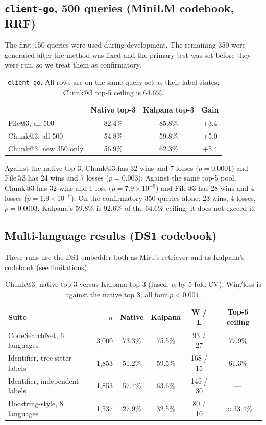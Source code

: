 \documentclass[11pt, a4paper]{article}
\begin{document}
\subsection{\texttt{client-go}, 500 queries (MiniLM codebook, RRF)}
The first 150 queries were used during development. The remaining 350 were generated after the method was fixed and the primary test was set before they were run, so we treat them as confirmatory.

\begin{table}[h]
\centering
\begin{tabular}{@{}lccc@{}}
\toprule
 & \textbf{Native top-3} & \textbf{Kalpana top-3} & \textbf{Gain} \\ \midrule
File@3, all 500 & 82.4\% & 85.8\% & +3.4 \\
Chunk@3, all 500 & 54.8\% & 59.8\% & +5.0 \\
Chunk@3, new 350 only & 56.9\% & 62.3\% & +5.4 \\ \bottomrule
\end{tabular}
\caption{\texttt{client-go}. All rows are on the same query set as their label states; Chunk@3 top-5 ceiling is 64.6\%.}
\end{table}

Against the native top 3, Chunk@3 has 32 wins and 7 losses ($p=0.0001$) and File@3 has 24 wins and 7 losses ($p=0.003$). Against the same top-5 pool, Chunk@3 has 32 wins and 1 loss ($p=7.9\times10^{-9}$) and File@3 has 28 wins and 4 losses ($p=1.9\times10^{-5}$). On the confirmatory 350 queries alone: 23 wins, 4 losses, $p=0.0003$. Kalpana's 59.8\% is 92.6\% of the 64.6\% ceiling; it does not exceed it.

\subsection{Multi-language results (DS1 codebook)}
These runs use the DS1 embedder both as Miru's retriever and as Kalpana's codebook (see limitations).

\begin{table}[h]
\centering
\small
\begin{tabular}{@{}lrcccc@{}}
\toprule
\textbf{Suite} & $n$ & \textbf{Native} & \textbf{Kalpana} & \textbf{W / L} & \textbf{Top-5 ceiling} \\ \midrule
CodeSearchNet, 6 languages & 3,000 & 73.3\% & 75.5\% & 93 / 27 & 77.9\% \\
Identifier, tree-sitter labels & 1,853 & 51.2\% & 59.5\% & 168 / 15 & 61.3\% \\
Identifier, independent labels & 1,853 & 57.4\% & 63.6\% & 145 / 30 & --- \\
Docstring-style, 8 languages & 1,537 & 27.9\% & 32.5\% & 80 / 10 & $\approx$33.4\% \\ \bottomrule
\end{tabular}
\caption{Chunk@3, native top-3 versus Kalpana top-3 (fused, $\alpha$ by 5-fold CV). Win/loss is against the native top 3; all four $p<0.001$.}
\end{table}
\end{document}
